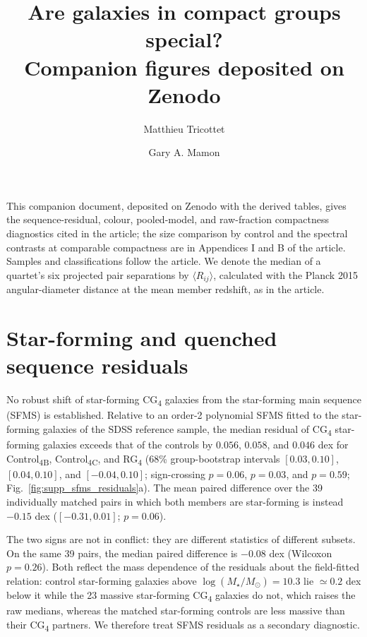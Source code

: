 \documentclass{aa}
\newcommand{\CB}{Control\textsubscript{4B}}
\newcommand{\CC}{Control\textsubscript{4C}}
\newcommand{\CG}{CG\textsubscript{4}}
\newcommand{\RG}{RG\textsubscript{4}}
\begin{document}
\title{Are galaxies in compact groups special?\\Companion figures deposited on Zenodo}
\author{Matthieu Tricottet \and Gary A. Mamon}
\date{}
\maketitle




This companion document, deposited on Zenodo with the derived tables, gives the sequence-residual, colour, pooled-model, and raw-fraction compactness diagnostics cited in the article; the size comparison by control and the spectral contrasts at comparable compactness are in Appendices I and B of the article. Samples and classifications follow the article. We denote the median of a quartet's six projected pair separations by \(\langle R_{ij}\rangle\), calculated with the Planck 2015 angular-diameter distance at the mean member redshift, as in the article.

\FloatBarrier
\section{Star-forming and quenched sequence residuals}

No robust shift of star-forming \CG{} galaxies from the star-forming main sequence (SFMS) is established. Relative to an order-2 polynomial SFMS fitted to the star-forming galaxies of the SDSS reference sample, the median residual of \CG{} star-forming galaxies exceeds that of the controls by \(0.056\), \(0.058\), and \(0.046\) dex for \CB{}, \CC{}, and \RG{} (68\% group-bootstrap intervals \([0.03, 0.10]\), \([0.04, 0.10]\), and \([-0.04, 0.10]\); sign-crossing \(p = 0.06\), \(p = 0.03\), and \(p = 0.59\); Fig.~\ref{fig:supp_sfms_residuals}a). The mean paired difference over the 39 individually matched pairs in which both members are star-forming is instead \(-0.15\) dex (\([-0.31, 0.01]\); \(p = 0.06\)).

The two signs are not in conflict: they are different statistics of different subsets. On the same 39 pairs, the median paired difference is \(-0.08\) dex (Wilcoxon \(p = 0.26\)). Both reflect the mass dependence of the residuals about the field-fitted relation: control star-forming galaxies above \(\log(M_\star/M_\odot) = 10.3\) lie \(\simeq 0.2\) dex below it while the 23 massive star-forming \CG{} galaxies do not, which raises the raw medians, whereas the matched star-forming controls are less massive than their \CG{} partners. We therefore treat SFMS residuals as a secondary diagnostic.
\end{document}
